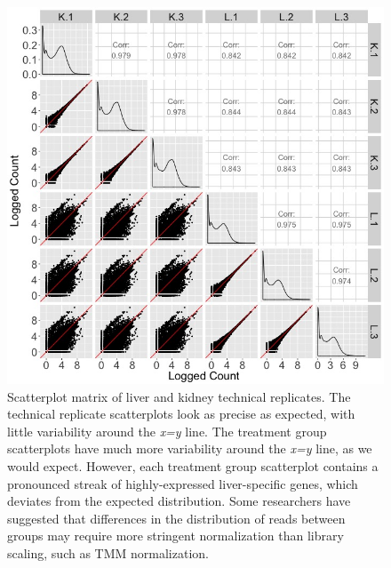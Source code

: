\documentclass{article}
\begin{document}
\clearpage
\null
\begin{figure}[t!]
\centerline{\includegraphics[width=1\columnwidth]{../Bioinformatics/Pictures/liverKidney/DEG-raw/K_L_SM.jpg}}
\caption{Scatterplot matrix of liver and kidney technical replicates. The technical replicate scatterplots look as precise as expected, with little variability around the \textit{x=y} line. The treatment group scatterplots have much more variability around the \textit{x=y} line, as we would expect. However, each treatment group scatterplot contains a pronounced streak of highly-expressed liver-specific genes, which deviates from the expected distribution. Some researchers have suggested that differences in the distribution of reads between groups may require more stringent normalization than library scaling, such as TMM normalization.
\label{KLSM}}
\end{figure}
\end{document}
